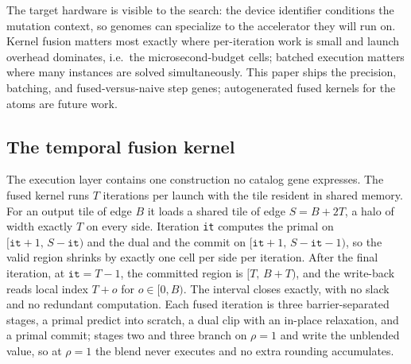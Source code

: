 The target hardware is visible to the search: the device identifier
conditions the mutation context, so genomes can specialize to the
accelerator they will run on. Kernel fusion matters most exactly where
per-iteration work is small and launch overhead dominates, i.e.\ the
microsecond-budget cells; batched execution matters where many instances
are solved simultaneously. This paper ships the precision, batching, and
fused-versus-naive step genes; autogenerated fused kernels for the atoms are
future work.


\subsection{The temporal fusion kernel}

The execution layer contains one construction no catalog gene expresses. The
fused kernel runs $T$ iterations per launch with the tile resident in shared
memory. For an output tile of edge $B$ it loads a shared tile of edge
$S = B + 2T$, a halo of width exactly $T$ on every side. Iteration \texttt{it}
computes the primal on $[\texttt{it}+1,\, S-\texttt{it})$ and the dual and the
commit on $[\texttt{it}+1,\, S-\texttt{it}-1)$, so the valid region shrinks by
exactly one cell per side per iteration. After the final iteration, at
$\texttt{it} = T-1$, the committed region is $[T,\, B+T)$, and the write-back
reads local index $T + o$ for $o \in [0, B)$. The interval closes exactly, with
no slack and no redundant computation. Each fused iteration is three
barrier-separated stages, a primal predict into scratch, a dual clip with an
in-place relaxation, and a primal commit; stages two and three branch on
$\rho = 1$ and write the unblended value, so at $\rho=1$ the blend never
executes and no extra rounding accumulates.

